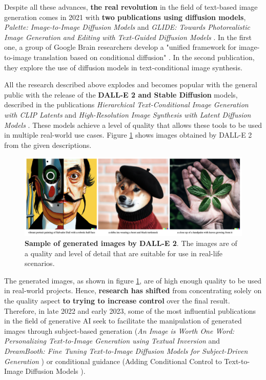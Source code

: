 Despite all these advances, \textbf{the real revolution} in the field of text-based image generation comes in 2021 with \textbf{two publications using diffusion models}, \textit{Palette: Image-to-Image Diffusion Models} \cite{saharia2022palette} and \textit{GLIDE: Towards Photorealistic Image Generation and Editing with Text-Guided Diffusion Models} \cite{nichol2021glide}. In the first one, a group of Google Brain researchers develop a "unified framework for image-to-image translation based on conditional diffusion" \cite{saharia2022palette}. In the second publication, they explore the use of diffusion models in text-conditional image synthesis. 

All the research described above explodes and becomes popular with the general public with the release of the \textbf{DALL-E 2 and Stable Diffusion} models, described in the publications \textit{Hierarchical Text-Conditional Image Generation with CLIP Latents} \cite{ramesh2022hierarchical} and \textit{High-Resolution Image Synthesis with Latent Diffusion Models} \cite{rombach2022high}. These models achieve a level of quality that allows these tools to be used in multiple real-world use cases. Figure \ref{fig:DallE2} shows images obtained by DALL-E 2 from the given descriptions. 

\begin{figure}
    \centering
    \includegraphics[width=1\textwidth]{Pictures/DallE2.png} 
    \caption{\textbf{Sample of generated images by DALL-E 2}. The images are of a quality and level of detail that are suitable for use in real-life scenarios. \cite{ramesh2022hierarchical}}
    \label{fig:DallE2}
\end{figure}

The generated images, as shown in figure \ref{fig:DallE2}, are of high enough quality to be used in real-world projects. Hence, \textbf{research has shifted} from concentrating solely on the quality aspect \textbf{to trying to increase control} over the final result. Therefore, in late 2022 and early 2023, some of the most influential publications in the field of generative AI seek to facilitate the manipulation of generated images through subject-based generation (\textit{\textit{An Image is Worth One Word: Personalizing Text-to-Image Generation using Textual Inversion}} \cite{gal2022image} and \textit{DreamBooth: Fine Tuning Text-to-Image Diffusion Models for Subject-Driven Generation} \cite{ruiz2023dreambooth}) or conditional guidance (Adding Conditional Control to Text-to-Image Diffusion Models \cite{zhang2023adding}).

